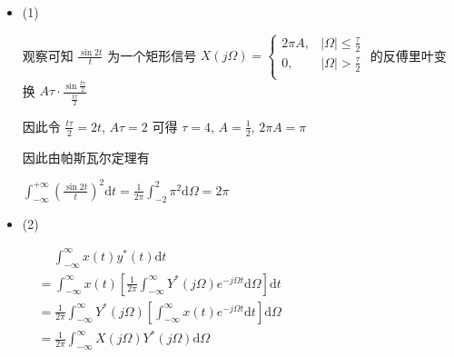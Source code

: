 \documentclass[a4paper,UTF8]{article}
\numberwithin{equation}{section}
\begin{document}
\begin{framed}
\begin{spacing}{1.5}
    \begin{itemize}
      \item (1)

      观察可知 $\displaystyle \frac{\sin 2t}{t}$ 为一个矩形信号 $X(j \Omega) = \begin{cases}
          2\pi A, & |\Omega| \le \frac{\tau}{2} \\
          0, & |\Omega| > \frac{\tau}{2} \\
      \end{cases}$ 的反傅里叶变换 $\displaystyle A\tau \cdot \frac{\sin \frac{t \tau}{2}}{\frac{t \tau}{2}}$
      
      因此令 $\displaystyle \frac{t \tau}{2} = 2t$, $\displaystyle A\tau = 2$ 可得 $\displaystyle \tau = 4$, $\displaystyle A = \frac{1}{2}$, $\displaystyle 2\pi A = \pi$
      
      因此由帕斯瓦尔定理有
      
      $\displaystyle \int_{-\infty}^{+\infty}\left( \frac{\sin 2t}{t} \right)^{2}\mathrm{d}t = \frac{1}{2\pi}\int_{-2}^{2}\pi^{2}\mathrm{d}\Omega = 2 \pi$
      
      \item (2)
      
      $
      \begin{aligned}
      &\quad\ \int_{-\infty}^{\infty}x(t)y^{*}(t)\mathrm{d}t  \\
      &= \int_{-\infty}^{\infty}x(t)[\frac{1}{2\pi}\int_{-\infty}^{\infty}Y^{*}(j\Omega)e^{-j\Omega t}\mathrm{d}\Omega]\mathrm{d}t  \\
      &= \frac{1}{2\pi}\int_{-\infty}^{\infty}Y^{*}(j\Omega)[\int_{-\infty}^{\infty}x(t)e^{-j\Omega t}\mathrm{d}t]\mathrm{d}\Omega  \\
      &= \frac{1}{2\pi}\int_{-\infty}^{\infty}X(j\Omega)Y^{*}(j\Omega)\mathrm{d}\Omega  \\
      \end{aligned}
      $
    \end{itemize}
\end{spacing}
\end{framed}


\newpage
\end{document}
